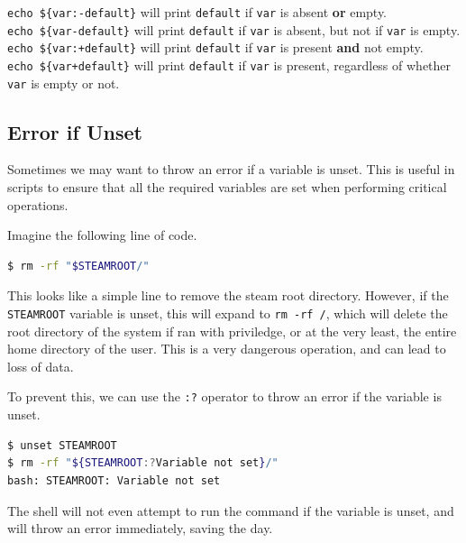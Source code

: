 \begin{remark}
  \lstinline|echo ${var:-default}| will print \lstinline{default} if \lstinline{var} is absent \textbf{or} empty. \\
  \lstinline|echo ${var-default}| will print \lstinline{default} if \lstinline{var} is absent, but not if \lstinline{var} is empty. \\
  \lstinline|echo ${var:+default}| will print \lstinline{default} if \lstinline{var} is present \textbf{and} not empty. \\
  \lstinline|echo ${var+default}| will print \lstinline{default} if \lstinline{var} is present,
  regardless of whether \lstinline{var} is empty or not. \\
\end{remark}

\subsection{Error if Unset}

Sometimes we may want to throw an error if a variable is unset. This is useful in scripts to ensure that all the required variables are set when performing critical operations.

Imagine the following line of code.

\begin{lstlisting}[language=bash]
$ rm -rf "$STEAMROOT/"
\end{lstlisting}

This looks like a simple line to remove the steam root directory. However, if the \lstinline{STEAMROOT} variable is unset, this will expand to \lstinline{rm -rf /}, which will delete the root directory of the system if ran with priviledge, or at the very least, the entire home directory of the user.
This is a very dangerous operation, and can lead to loss of data.

To prevent this, we can use the \lstinline{:?} operator to throw an error if the variable is unset.

\begin{lstlisting}[language=bash]
$ unset STEAMROOT
$ rm -rf "${STEAMROOT:?Variable not set}/"
bash: STEAMROOT: Variable not set
\end{lstlisting}

The shell will not even attempt to run the command if the variable is unset, and will throw an error immediately, saving the day.

